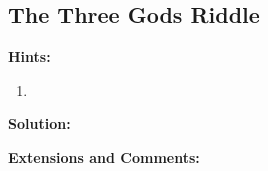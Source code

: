 \subsection{The Three Gods Riddle}

\textbf{Hints:}

\begin{enumerate}
    \item 
\end{enumerate}

\textbf{Solution:}



\textbf{Extensions and Comments:}